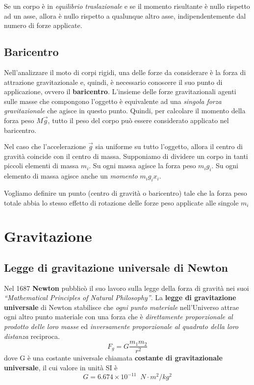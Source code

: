 \documentclass[a4paper,11pt,oneside]{book}
\begin{document}
Se un corpo è in \emph{equilibrio traslazionale} e se il momento risultante è nullo rispetto ad un asse, allora è nullo rispetto a qualunque altro asse, 
indipendentemente dal numero di forze applicate.

\section{Baricentro}
Nell’analizzare il moto di corpi rigidi, una delle forze da considerare è la forza di attrazione gravitazionale e, quindi, è necessario conoscere il suo 
punto di applicazione, ovvero il \textbf{baricentro}. 
L’insieme delle forze gravitazionali agenti sulle masse che compongono l’oggetto è equivalente ad una \emph{singola forza gravitazionale} che agisce in questo
punto. Quindi, per calcolare il momento della forza peso $M\vec{g}$, tutto il peso del corpo può essere considerato applicato nel baricentro.

Nel caso che l’accelerazione $\vec{g}$ sia uniforme su tutto l’oggetto, allora il centro di gravità coincide con il centro di massa. Supponiamo di dividere un corpo
in tanti piccoli elementi di massa $m_i$. Su ogni massa agisce la forza peso $m_ig_i$. Su ogni elemento di massa agisce anche un \emph{momento} $m_ig_ix_i$.

Vogliamo definire un punto (centro di gravità o baricentro) tale che la forza peso totale abbia lo stesso effetto di rotazione delle forze peso applicate alle singole $m_i$


\chapter{Gravitazione}
\section{Legge di gravitazione universale di Newton}
Nel 1687 \textbf{Newton} pubblicò il suo lavoro sulla legge della forza di gravità nei suoi \emph{“Mathematical Principles of Natural Philosophy”}. 
La \textbf{legge di gravitazione universale} di Newton stabilisce che \emph{ogni punto materiale} nell’Universo attrae ogni altro punto materiale con una forza che è 
\emph{direttamente proporzionale al prodotto delle loro masse} ed \emph{inversamente proporzionale al quadrato della loro distanza} reciproca.
\begin{equation*}
    F_g = G \frac{m_1m_2}{r^2}
\end{equation*}
dove G è una costante universale chiamata \textbf{costante di gravitazionale universale}, il cui valore in unità SI è
\begin{equation*}
    G = 6.674 \times 10^{-11} \;\; N\cdot m^2/kg^2
\end{equation*}
\end{document}
